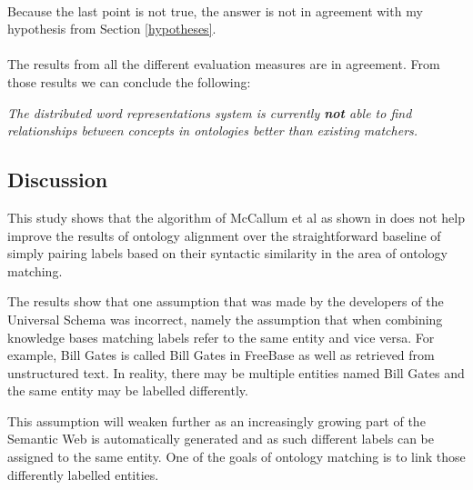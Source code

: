 \documentclass{article}
\begin{document}
\paragraph{}
 Because the last point is not true, the answer is not in agreement with my hypothesis from Section \ref{hypotheses}.
 \paragraph{}
The results from all the different evaluation measures are in agreement. From those results we can conclude the following:

 \begin{center}
 \textit{
 The distributed word representations system is currently \textbf{not} able to find relationships between concepts in ontologies better than existing matchers.
 }
 \end{center}
 
 
 \subsection{Discussion} \label{discussion}
 
 
 
 
  This study shows that the algorithm of McCallum et al as shown in \cite{mccallumweblecture} does not help improve the results of ontology alignment over the straightforward baseline of simply pairing labels based on their syntactic similarity in the area of ontology matching. 

  The results show that one assumption that was made by the developers of the Universal Schema was incorrect, namely the assumption that when combining knowledge bases matching labels refer to the same entity and vice versa. For example, Bill Gates is called Bill Gates in FreeBase as well as retrieved from unstructured text. In reality, there may be multiple entities named Bill Gates and the same entity may be labelled differently. 
  
  This assumption will weaken further as an increasingly growing part of the Semantic Web is automatically generated and as such different labels can be assigned to the same entity. One of the goals of ontology matching is to link those differently labelled entities.
  
  
\end{document}
